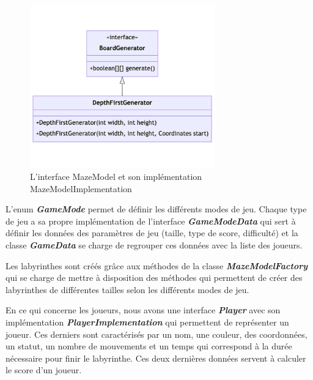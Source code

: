 \begin{figure}[htb]
    \centering
    \includegraphics[width=8cm]{ressources/Implementation/Labyrinthe/Modele/DepthFirstGenerator.png}
    \caption{L'interface MazeModel et son implémentation MazeModelImplementation}
    \label{fig:MazeModelAndImplementation}
\end{figure}

L'enum \textbf{\textit{GameMode}} permet de définir les différents modes de
jeu. Chaque type de jeu a sa propre implémentation de l'interface
\textbf{\textit{GameModeData}} qui sert à définir les données des paramètres de
jeu (taille, type de score, difficulté) et la classe \textbf{\textit{GameData}}
se charge de regrouper ces données avec la liste des joueurs.

Les labyrinthes sont créés grâce aux méthodes de la classe
\textbf{\textit{MazeModelFactory}} qui se charge de mettre à disposition des
méthodes qui permettent de créer des labyrinthes de différentes tailles selon
les différents modes de jeu.

En ce qui concerne les joueurs, nous avons une interface
\textbf{\textit{Player}} avec son implémentation
\textbf{\textit{PlayerImplementation}} qui permettent de représenter un joueur.
Ces derniers sont caractérisés par un nom, une couleur, des coordonnées, un
statut, un nombre de mouvements et un temps qui correspond à la durée nécessaire pour
finir le labyrinthe. Ces deux dernières données servent à calculer le score
d'un joueur.

